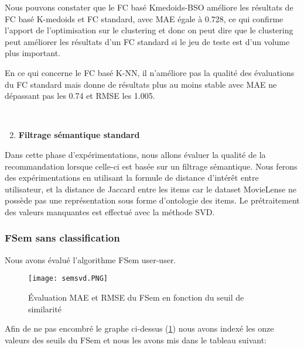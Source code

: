 Nous pouvons constater que le FC basé Kmedoids-BSO améliore les résultats de FC basé K-medoids et FC standard, avec MAE égale à 0.728, ce qui confirme l'apport de l'optimisation sur le clustering et donc on peut dire que le clustering peut améliorer les résultats d'un FC standard si le jeu de teste est d'un volume plus important.

En ce qui concerne le FC basé K-NN, il n'améliore pas la qualité des évaluations du FC standard mais donne de résultats plus au moins stable avec MAE ne dépassant pas les 0.74 et RMSE les 1.005.

\mbox{}\\
\begin{enumerate}[nosep,label=\textbf{\arabic*)}]
	 \setcounter{enumi}{1}
	\item \textbf{Filtrage sémantique standard}
	\end{enumerate}\mbox{} \indent Dans cette phase d’expérimentations, nous allons évaluer la qualité de la recommandation lorsque celle-ci est basée sur un filtrage sémantique. Nous ferons des expérimentations en utilisant la formule de distance d'intérêt entre utilisateur, et la distance de Jaccard entre les items car le dataset MovieLense ne possède pas une représentation sous forme d'ontologie des items.
Le prétraitement des valeurs manquantes est effectué avec la méthode SVD.

\subsubsection*{FSem sans classification}
Nous avons évalué l'algorithme FSem user-user.

\begin{figure}[H]
		\centering
	\texttt{[image: semsvd.PNG]}
	\caption{Évaluation MAE et RMSE du FSem en fonction du seuil de similarité}
	\label{fig:MAEsem}
\end{figure}

Afin de ne pas encombré le graphe ci-dessus (\ref{fig:MAEsem}) nous avons indexé les onze valeurs des seuils du FSem et nous les avons mis dans le tableau suivant:

